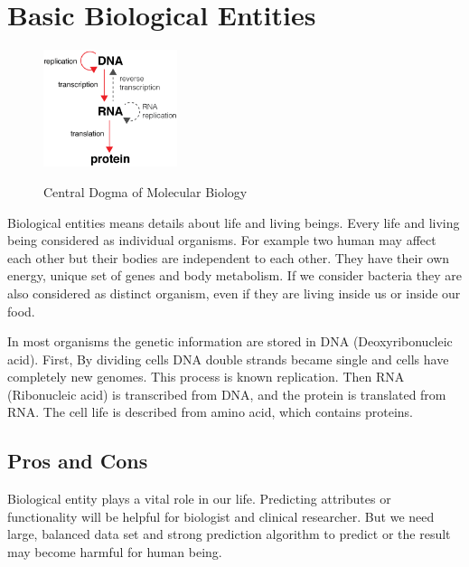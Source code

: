 \section{Basic Biological Entities}
\begin{figure}
\centering
    \includegraphics[width=0.35\textwidth]{dna.eps}
  \caption{Central Dogma of Molecular Biology}\cite{Anderson03}
  
\end{figure}
\leavevmode

Biological entities means details about life and living beings. Every life and living being considered as individual organisms. For example two human may affect each other but their bodies are independent to each other. They have their own energy, unique set of genes and body metabolism. If we consider bacteria they are also considered as distinct organism, even if they are living inside us or inside our food.

In most organisms the genetic information are stored in DNA (Deoxyribonucleic acid). First, By dividing cells DNA double strands became single and cells have completely new genomes. This process is known replication. Then RNA (Ribonucleic acid) is transcribed from DNA, and the protein is translated from RNA. The cell life is described from amino acid, which contains proteins.


\subsection{Pros and Cons}
Biological entity plays a vital role in our life. Predicting attributes or functionality will be helpful for biologist and clinical researcher.
But we need large, balanced data set and strong prediction algorithm to predict or the result may become harmful for human being.

